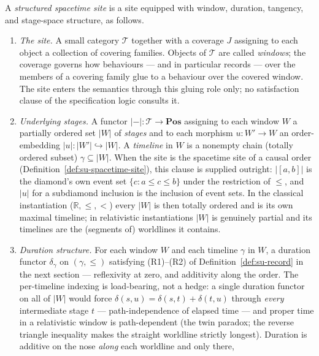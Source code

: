\begin{definition}\label{def:su-structured-site}
A \emph{structured spacetime site} is a site equipped with window,
duration, tangency, and stage-space structure, as follows.
\begin{enumerate}
\item[(T1)] \emph{The site.} A small category $\mathcal{T}$ together
  with a coverage $J$ assigning to each object a collection of
  covering families. Objects of $\mathcal{T}$ are called
  \emph{windows}; the coverage governs how behaviours --- and
  in particular records --- over the members of a covering family
  glue to a behaviour over the covered window. The site enters the
  semantics through this gluing role only; no satisfaction clause of
  the specification logic consults it.
\item[(T2)] \emph{Underlying stages.} A functor
  $|{-}| \colon \mathcal{T} \to \mathbf{Pos}$ assigning to each window
  $W$ a partially ordered set $|W|$ of \emph{stages} and to each
  morphism $u \colon W' \to W$ an order-embedding
  $|u| \colon |W'| \hookrightarrow |W|$. A \emph{timeline} in $W$ is a
  nonempty chain (totally ordered subset) $\gamma \subseteq |W|$.
  When the site is the spacetime site of a causal order
  (Definition~\ref{def:su-spacetime-site}), this clause is supplied
  outright: $|[a,b]|$ is the diamond's own event set
  $\{c : a \le c \le b\}$ under the restriction of $\le$, and
  $|u|$ for a subdiamond inclusion is the inclusion of event sets. In
  the classical instantiation ($\mathbb{R}, \le, <$) every $|W|$ is
  then totally ordered
  and is its own maximal timeline; in relativistic instantiations
  $|W|$ is genuinely partial and its timelines are the (segments of)
  worldlines it contains.
\item[(T3)] \emph{Duration structure.} For each window $W$ and each
  timeline $\gamma$ in $W$, a duration functor $\delta_\gamma$ on
  $(\gamma, \le)$ satisfying (R1)--(R2) of
  Definition~\ref{def:su-record} in the next section --- reflexivity
  at zero, and additivity along the order. The per-timeline indexing
  is load-bearing, not a hedge: a single duration functor on all of
  $|W|$ would force $\delta(s,u) = \delta(s,t) + \delta(t,u)$
  through \emph{every} intermediate stage $t$ --- path-independence
  of elapsed time --- and proper time in a relativistic window is
  path-dependent (the twin paradox; the reverse triangle inequality
  makes the straight worldline strictly longest). Duration is
  additive on the nose \emph{along} each worldline and only there,

\end{enumerate}
\end{definition}
